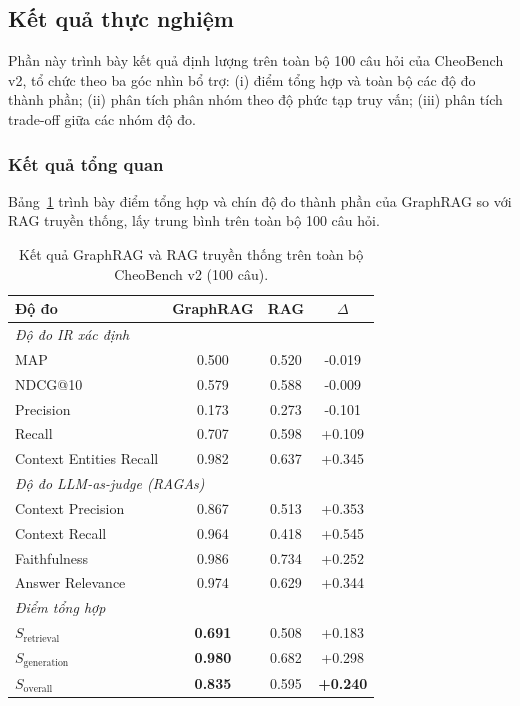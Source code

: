 \subsection{Kết quả thực nghiệm}

Phần này trình bày kết quả định lượng trên toàn bộ 100 câu hỏi của CheoBench v2, tổ chức theo ba góc nhìn bổ trợ: (i) điểm tổng hợp và toàn bộ các độ đo thành phần; (ii) phân tích phân nhóm theo độ phức tạp truy vấn; (iii) phân tích trade-off giữa các nhóm độ đo.

\subsubsection{Kết quả tổng quan}

Bảng~\ref{tab:baseline_overall} trình bày điểm tổng hợp và chín độ đo thành phần của GraphRAG so với RAG truyền thống, lấy trung bình trên toàn bộ 100 câu hỏi.

\begin{table}[h]
\centering
\caption{Kết quả GraphRAG và RAG truyền thống trên toàn bộ CheoBench v2 (100 câu).}
\label{tab:baseline_overall}
\begin{tabular}{lccc}
\hline
\textbf{Độ đo} & \textbf{GraphRAG} & \textbf{RAG} & \textbf{$\Delta$} \\
\hline
\multicolumn{4}{l}{\textit{Độ đo IR xác định}} \\
MAP                     & 0.500 & 0.520 & -0.019 \\
NDCG@10                 & 0.579 & 0.588 & -0.009 \\
Precision               & 0.173 & 0.273 & -0.101 \\
Recall                  & 0.707 & 0.598 & +0.109 \\
Context Entities Recall & 0.982 & 0.637 & +0.345 \\
\hline
\multicolumn{4}{l}{\textit{Độ đo LLM-as-judge (RAGAs)}} \\
Context Precision       & 0.867 & 0.513 & +0.353 \\
Context Recall          & 0.964 & 0.418 & +0.545 \\
Faithfulness            & 0.986 & 0.734 & +0.252 \\
Answer Relevance        & 0.974 & 0.629 & +0.344 \\
\hline
\multicolumn{4}{l}{\textit{Điểm tổng hợp}} \\
$S_{\text{retrieval}}$  & \textbf{0.691} & 0.508 & +0.183 \\
$S_{\text{generation}}$ & \textbf{0.980} & 0.682 & +0.298 \\
$S_{\text{overall}}$    & \textbf{0.835} & 0.595 & \textbf{+0.240} \\
\hline
\end{tabular}
\end{table}

